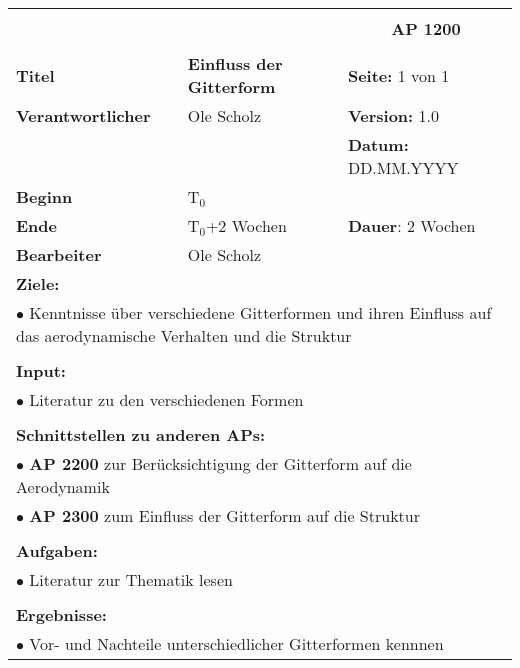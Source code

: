 \clearpage
\begin{table}[!h]
	\begin{center}
		\begin{tabular}{|p{35mm}||p{55mm}|p{50mm}||p{40mm}|}
			\hline
			\multicolumn{3}{|l||}{\textbf{}} & \multicolumn{1}{c|}{}\\
			\multicolumn{3}{|l||}{\textbf{}} & \multicolumn{1}{c|}{\textbf{AP 1200}}\\
			\multicolumn{3}{|l||}{\textbf{}} & \multicolumn{1}{c|}{}\\
			\hline\hline
			\textbf{Titel} & \multicolumn{2}{p{7cm}||}{\textbf{Einfluss der Gitterform}} 
			& \textbf{Seite:} 1 von 1\\
			\hline
			\textbf{Verantwortlicher} & \multicolumn{2}{l||}{Ole Scholz} & \textbf{Version:} 1.0\\
			\hline
			\multicolumn{3}{|l||}{} & \textbf{Datum:} DD.MM.YYYY\\
			\hline\hline
			\textbf{Beginn} & \multicolumn{2}{l||}{T$_0$} & \\
			\hline
			\textbf{Ende} & \multicolumn{2}{l||}{T$_0$+2 Wochen} & \textbf{Dauer}: 2 Wochen\\
			\hline\hline
			\textbf{Bearbeiter} & \multicolumn{3}{l|}{Ole Scholz}\\
			\hline\hline
			\multicolumn{4}{|p{150mm}|}{\textbf{Ziele:}}\\
			\multicolumn{4}{|p{150mm}|}{$\bullet$ Kenntnisse über verschiedene Gitterformen und ihren Einfluss auf das aerodynamische Verhalten und die Struktur}\\
			\multicolumn{4}{|p{150mm}|}{}\\
			\multicolumn{4}{|p{150mm}|}{\textbf{Input:}}\\
			\multicolumn{4}{|p{150mm}|}{$\bullet$ Literatur zu den verschiedenen Formen}\\
			\multicolumn{4}{|p{150mm}|}{}\\
			\multicolumn{4}{|p{150mm}|}{\textbf{Schnittstellen zu anderen APs:}}\\
			\multicolumn{4}{|p{150mm}|}{$\bullet$ \textbf{AP 2200} zur Berücksichtigung der Gitterform auf die Aerodynamik}\\
			\multicolumn{4}{|p{150mm}|}{$\bullet$ \textbf{AP 2300} zum Einfluss der Gitterform auf die Struktur}\\
			\multicolumn{4}{|p{150mm}|}{}\\
			\multicolumn{4}{|p{150mm}|}{\textbf{Aufgaben:}}\\
			\multicolumn{4}{|p{150mm}|}{$\bullet$ Literatur zur Thematik lesen}\\
			\multicolumn{4}{|p{150mm}|}{}\\
			\multicolumn{4}{|p{150mm}|}{\textbf{Ergebnisse:}}\\
			\multicolumn{4}{|p{150mm}|}{$\bullet$ Vor- und Nachteile unterschiedlicher Gitterformen kennnen}\\
			\hline
		\end{tabular}
	\end{center}
\end{table}
	

